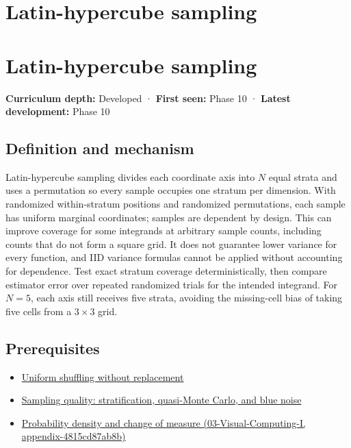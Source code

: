 \hypertarget{appendix-1c5e85693a06}{}
\section*{Latin-hypercube sampling}
\section{Latin-hypercube sampling}\label{latin-hypercube-sampling}

\textbf{Curriculum depth:} Developed · \textbf{First seen:} Phase 10 · \textbf{Latest development:} Phase 10

\subsection{Definition and mechanism}\label{definition-and-mechanism}

Latin-hypercube sampling divides each coordinate axis into \(N\) equal strata and uses a permutation so every sample occupies one stratum per dimension. With randomized within-stratum positions and randomized permutations, each sample has uniform marginal coordinates; samples are dependent by design. This can improve coverage for some integrands at arbitrary sample counts, including counts that do not form a square grid. It does not guarantee lower variance for every function, and IID variance formulas cannot be applied without accounting for dependence. Test exact stratum coverage deterministically, then compare estimator error over repeated randomized trials for the intended integrand. For \(N=5\), each axis still receives five strata, avoiding the missing-cell bias of taking five cells from a \(3\times3\) grid.

\subsection{Prerequisites}\label{prerequisites}

\begin{itemize}
\tightlist
\item
  \hyperref[appendix-184fcc411663]{Uniform shuffling without replacement}
\item
  \hyperref[appendix-9f693ffd82bc]{Sampling quality: stratification, quasi-Monte Carlo, and blue noise}
\item
  \href{}{Probability density and change of measure (03-Visual-Computing-I, appendix-4815cd87ab8b)}
\end{itemize}

